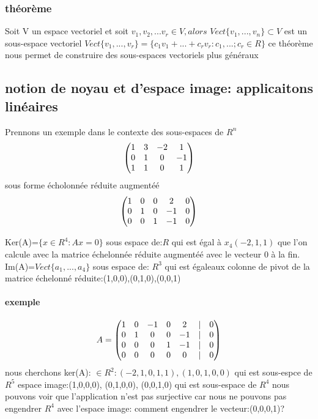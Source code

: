 \documentclass[a4paper,10pt]{article}
\begin{document}
\subsubsection{théorème}
Soit V un espace vectoriel et soit $v_1,v_2,...v_r\in V, alors$ $Vect\{v_1,...,v_n\}\subset V$ est un sous-espace vectoriel
\newline
$Vect\{v_1,...,v_r\}=\{c_1v_1+...+c_rv_r:c_1,...;c_r\in R\}$
\newline
ce théorème nous permet de construire des sous-espaces vectoriels plus généraux
\subsection{notion de noyau et d'espace image: applicaitons linéaires}
Prennons un exemple dans le contexte des sous-espaces de $R^n$
\[
\begin{pmatrix}
1&3&-2&1\cr
0&1&0&-1\cr
1&1&0&1\cr
\end{pmatrix}
\]
\newline
sous forme écholonnée réduite augmentéé
\newline
\[
\begin{pmatrix}
1&0&0&2&0\cr
0&1&0&-1&0\cr
0&0&1&-1&0\cr
\end{pmatrix}
\]
\newline

Ker(A)=$\{x\in R^4:Ax=0\}$ sous espace de:$R$ qui est égal à $x_4(-2,1,1)$ que l'on calcule avec la matrice échelonnée réduite augmentéé avec le vecteur 0 à la fin.
\newline
Im(A)=$Vect\{a_1,...,a_4\}$ sous espace de: $R^3$ qui est égaleaux colonne de pivot de la matrice échelonné réduite:(1,0,0),(0,1,0),(0,0,1)
\paragraph{exemple}
\[A=
\begin{pmatrix}
1&0&-1&0&2&|&0\cr
0&1&0&0&-1&|&0\cr
0&0&0&1&-1&|&0\cr
0&0&0&0&0&|&0\cr
\end{pmatrix}
\]
\newline
nous cherchons ker(A): $\in R^2:(-2,1,0,1,1),(1,0,1,0,0)$ qui est sous-espce de $R^5$
\newline
espace image:(1,0,0,0), (0,1,0,0), (0,0,1,0) qui est sous-espace de $R^4$
\newline
nous pouvons voir que l'application n'est pas surjective car nous ne pouvons pas engendrer $R^4$ avec l'espace image: comment engendrer le vecteur:(0,0,0,1)?
\end{document}
